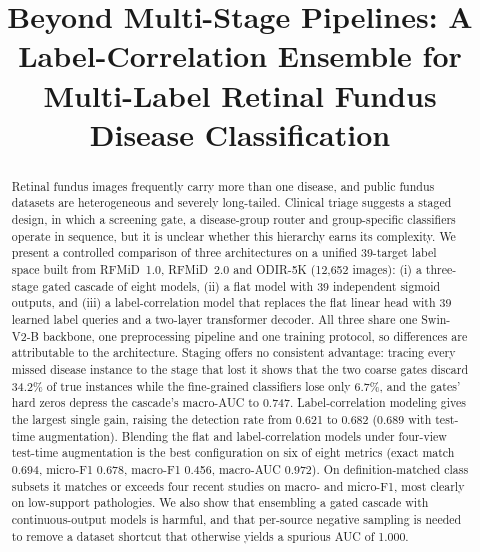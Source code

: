 \documentclass[conference]{IEEEtran}
\begin{document}
\title{Beyond Multi-Stage Pipelines: A Label-Correlation Ensemble for Multi-Label Retinal Fundus Disease Classification}

\author{
}

\maketitle

\begin{abstract}
Retinal fundus images frequently carry more than one disease, and public fundus
datasets are heterogeneous and severely long-tailed. Clinical triage suggests a
staged design, in which a screening gate, a disease-group router and group-specific
classifiers operate in sequence, but it is unclear whether this hierarchy earns its
complexity. We present a controlled comparison of three architectures on a unified
39-target label space built from RFMiD~1.0, RFMiD~2.0 and ODIR-5K (12{,}652 images):
(i) a three-stage gated cascade of eight models, (ii) a flat model with 39
independent sigmoid outputs, and (iii) a label-correlation model that replaces the
flat linear head with 39 learned label queries and a two-layer transformer decoder.
All three share one Swin-V2-B backbone, one preprocessing pipeline and one training
protocol, so differences are attributable to the architecture. Staging offers no
consistent advantage: tracing every missed disease instance to the stage that lost
it shows that the two coarse gates discard 34.2\% of true instances while the
fine-grained classifiers lose only 6.7\%, and the gates' hard zeros depress the
cascade's macro-AUC to 0.747. Label-correlation modeling gives the largest single
gain, raising the detection rate from 0.621 to 0.682 (0.689 with test-time
augmentation). Blending the flat and label-correlation models under four-view
test-time augmentation is the best configuration on six of eight metrics (exact
match 0.694, micro-F1 0.678, macro-F1 0.456, macro-AUC 0.972). On definition-matched class subsets it matches or exceeds four recent studies on
macro- and micro-F1, most clearly on low-support pathologies. We also show that ensembling a gated
cascade with continuous-output models is harmful, and that per-source negative
sampling is needed to remove a dataset shortcut that otherwise yields a spurious
AUC of 1.000.
\end{abstract}
\end{document}
